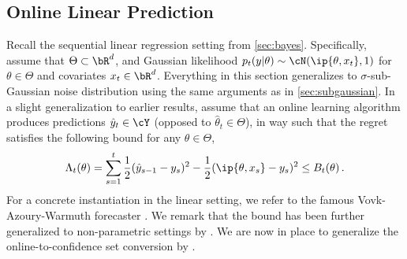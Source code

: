 


\subsection{Online Linear Prediction}\label{sec:sparse}
Recall the sequential linear regression setting from \cref{sec:bayes}. Specifically, assume that $\Theta \subset \bR^d$, and Gaussian likelihood $p_t(y|\theta) \sim \cN(\ip{\theta, x_t}, 1)$ for $\theta \in \Theta$ and covariates $x_t \in \bR^d$. Everything in this section generalizes to $\sigma$-sub-Gaussian noise distribution using the same arguments as in \cref{sec:subgaussian}. In a slight generalization to earlier results, assume that an online learning algorithm produces predictions $\hat y_t \in \cY$ (opposed to $\hat \theta_t \in \Theta$), in way such that the regret satisfies the following bound for any $\theta \in \Theta$,
\begin{align*}
    \Lambda_t(\theta) = \sum_{s=1}^t \frac{1}{2}(\hat y_{s-1} - y_s)^2 - \frac{1}{2}(\ip{\theta, x_s} - y_s)^2 \leq B_t(\theta) \,.
\end{align*}
For a concrete instantiation in the linear setting, we refer to the famous Vovk-Azoury-Warmuth forecaster \citep{vovk1997competitive,azoury2001relative}. We remark that the bound has been further generalized to non-parametric settings by \citet{rakhlin2014online}. We are now in place to generalize the online-to-confidence set conversion by \citet{abbasi2012online}.

